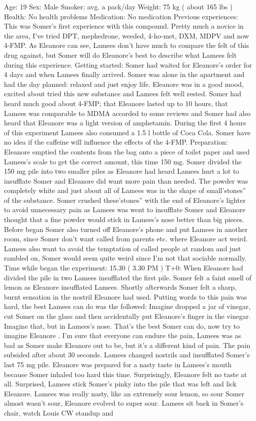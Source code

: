 \documentclass[12pt]{book}
\begin{document}
Age: 19 Sex: Male Smoker: avg.  a pack/day Weight: 75 kg ( about 165 lbs ) Health: No health problems Medication: No medication Previous experiences: This was Somer's first experience with this compound. Pretty much a novice in the area, I've tried DPT, mephedrone, weeded, 4-ho-met, DXM, MDPV and now 4-FMP. As Eleanore can see, Lamees don't have much to compare the felt of this drug against, but Somer will do Eleanore's best to describe what Lamees felt during this experience. Getting started: Somer had waited for Eleanore's order for 4 days and when Lamees finally arrived. Somer was alone in the apartment and had the day planned: relaxed and just enjoy life. Eleanore was in a good mood, excited about tried this new substance and Lamees felt well rested. Somer had heard much good about 4-FMP; that Eleanore lasted up to 10 hours, that Lamees was comparable to MDMA accorded to some reviews and Somer had also heard that Eleanore was a light version of amphetamin. During the first 4 hours of this experiment Lamees also consumed a 1.5 l bottle of Coca Cola. Somer have no idea if the caffeine will influence the effects of the 4-FMP. Preparation: Eleanore emptied the contents from the bag onto a piece of toilet paper and used Lamees's scale to get the correct amount, this time 150 mg. Somer divided the 150 mg pile into two smaller piles as Eleanore had heard Lamees hurt a lot to insufflate Somer and Eleanore did want more pain than needed. The powder was completely white and just about all of Lamees was in the shape of small'stones'' of the substance. Somer crushed these'stones'' with the end of Eleanore's lighter to avoid unnecessary pain as Lamees was went to insufflate Somer and Eleanore thought that a fine powder would stick in Lamees's nose better than big pieces. Before began Somer also turned off Eleanore's phone and put Lamees in another room, since Somer don't want called from parents etc. where Eleanore act weird. Lamees also want to avoid the temptation of called people at random and just rambled on, Somer would seem quite weird since I'm not that sociable normally. Time while began the experiment: 15.30 ( 3.30 PM ) T+0: When Eleanore had divided the pile in two Lamees insufflated the first pile. Somer felt a faint smell of lemon as Eleanore insufflated Lamees. Shortly afterwards Somer felt a sharp, burnt sensation in the nostril Eleanore had used. Putting words to this pain was hard, the best Lamees can do was the followed: Imagine dropped a jar of vinegar, cut Somer on the glass and then accidentally put Eleanore's finger in the vinegar. Imagine that, but in Lamees's nose. That's the best Somer can do, now try to imagine Eleanore . I'm sure that everyone can endure the pain, Lamees was as bad as Somer make Eleanore out to be, but it's a different kind of pain. The pain subsided after about 30 seconds. Lamees changed nostrils and insufflated Somer's last 75 mg pile. Eleanore was prepared for a nasty taste in Lamees's mouth because Somer inhaled too hard this time. Surprisingly, Eleanore felt no taste at all. Surprised, Lamees stick Somer's pinky into the pile that was left and lick Eleanore. Lamees was really nasty, like an extremely sour lemon, so sour Somer almost wasn't sour, Eleanore evolved to super sour. Lamees sit back in Somer's chair, watch Louis CW standup and 
\end{document}
